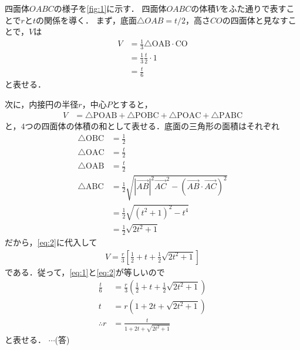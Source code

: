 \documentclass[a4paper,10pt]{ltjsarticle}
\begin{document}
\begin{multicols}{2}
  四面体$OABC$の様子を\cref{fig:1}に示す．
  四面体$OABC$の体積$V$をふた通りで表すことで$r$と$t$の関係を導く．
  まず，底面$\triangle OAB=t/2$，高さ$CO$の四面体と見なすことで，$V$は
  \begin{align}
    V
     & = \frac{1}{3} \triangle \mathrm{OAB}\cdot \mathrm{CO} \nonumber \\
     & = \frac{1}{3} \frac{t}{2} \cdot 1 \nonumber                     \\
     & = \frac{t}{6} \label{eq:1}
  \end{align}
  と表せる．

  次に，内接円の半径$r$，中心$P$とすると，
  \begin{align}
    V
     & = \triangle \mathrm{POAB} + \triangle \mathrm{POBC} + \triangle \mathrm{POAC} +  \triangle \mathrm{PABC} \label{eq:2}
  \end{align}
  と，$4$つの四面体の体積の和として表せる．底面の三角形の面積はそれぞれ
  \begin{align*}
    \triangle \mathrm{OBC} & = \frac{1}{2}                                                        \\
    \triangle \mathrm{OAC} & = \frac{t}{2}                                                        \\
    \triangle \mathrm{OAB} & = \frac{t}{2}                                                        \\
    \triangle \mathrm{ABC} & = \frac{1}{2}\sqrt{|\vec{AB}|^2\vec{AC}^2-(\vec{AB}\cdot\vec{AC})^2} \\
                           & = \frac{1}{2}\sqrt{(t^2+1)^2-t^4}                                    \\
                           & = \frac{1}{2}\sqrt{2t^2+1}
  \end{align*}
  だから，\cref{eq:2}に代入して
  \begin{align}
    V = \frac{r}{3}\left[\frac{1}{2}+t+\frac{1}{2}\sqrt{2t^2+1}\right]\label{eq:3}
  \end{align}
  である．従って，\cref{eq:1}と\cref{eq:2}が等しいので
  \begin{align*}
    \frac{t}{6}  & = \frac{r}{3} \left( \frac{1}{2} + t + \frac{1}{2} \sqrt{2t^2+1} \right) \\
    t            & = r (1 + 2t + \sqrt{2t^2+1})                                             \\
    \therefore r & = \frac{t}{1+2t+\sqrt{2t^2+1}}
  \end{align*}
  と表せる．  $\cdots$(答)


\end{multicols}
\end{document}
